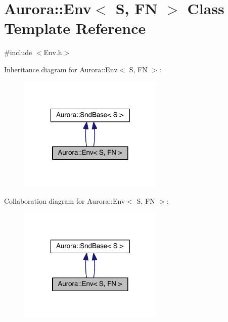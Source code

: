 \hypertarget{class_aurora_1_1_env}{}\section{Aurora\+:\+:Env$<$ S, FN $>$ Class Template Reference}
\label{class_aurora_1_1_env}


{\ttfamily \#include $<$Env.\+h$>$}



Inheritance diagram for Aurora\+:\+:Env$<$ S, FN $>$\+:\nopagebreak
\begin{figure}[H]
\begin{center}
\leavevmode
\includegraphics[width=196pt]{class_aurora_1_1_env__inherit__graph}
\end{center}
\end{figure}


Collaboration diagram for Aurora\+:\+:Env$<$ S, FN $>$\+:\nopagebreak
\begin{figure}[H]
\begin{center}
\leavevmode
\includegraphics[width=196pt]{class_aurora_1_1_env__coll__graph}
\end{center}
\end{figure}
